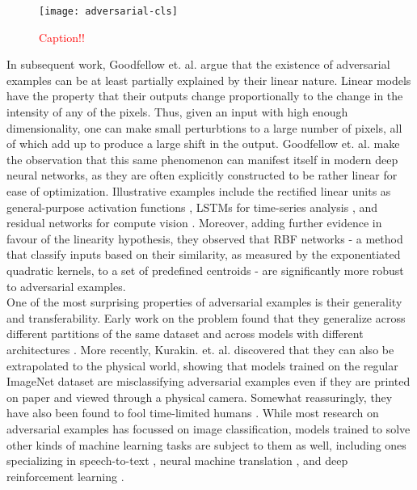 \documentclass{report}
\newcommand\todo[1]{\textcolor{red}{#1}}
\begin{document}
\bigskip

\begin{figure}
\begin{center}
\texttt{[image: adversarial-cls]}
\caption{\todo{Caption!!}}
\label{fig:adversarial-cls}
\end{center}
\end{figure}


\noindent In subsequent work, Goodfellow et. al. \cite{explaining-and-harnessing} argue that the existence of adversarial examples can be at least partially explained by their linear nature. Linear models have the property that their outputs change proportionally to the change in the intensity of any of the pixels. Thus, given an input with high enough dimensionality, one can make small perturbtions to a large number of pixels, all of which add up to produce a large shift in the output. Goodfellow et. al. make the observation that this same phenomenon can manifest itself in modern deep neural networks, as they are often explicitly constructed to be rather linear for ease of optimization. Illustrative examples include the rectified linear units as general-purpose activation functions \cite{relu}, LSTMs for time-series analysis \cite{lstm}, and residual networks for compute vision \cite{resnet}. Moreover, adding further evidence in favour of the linearity hypothesis, they observed that RBF networks \cite{rbf-networks} - a method that classify inputs based on their similarity, as measured by the exponentiated quadratic kernels, to a set of predefined centroids - are significantly more robust to adversarial examples. \\

\noindent One of the most surprising properties of adversarial examples is their generality and transferability. Early work on the problem found that they generalize across different partitions of the same dataset \cite{intriguing-properties} and across models with different architectures \cite{explaining-and-harnessing}. More recently, Kurakin. et. al. \cite{kurakin16} discovered that they can also be extrapolated to the physical world, showing that models trained on the regular ImageNet \cite{imagenet} dataset are misclassifying adversarial examples even if they are printed on paper and viewed through a physical camera. Somewhat reassuringly, they have also been found to fool time-limited humans \cite{humans-adv}. While most research on adversarial examples has focussed on image classification, models trained to solve other kinds of machine learning tasks are subject to them as well, including ones specializing in speech-to-text \cite{audio-adv}, neural machine translation \cite{nmt-adv}, and deep reinforcement learning \cite{rl-adv}. \\
\end{document}
